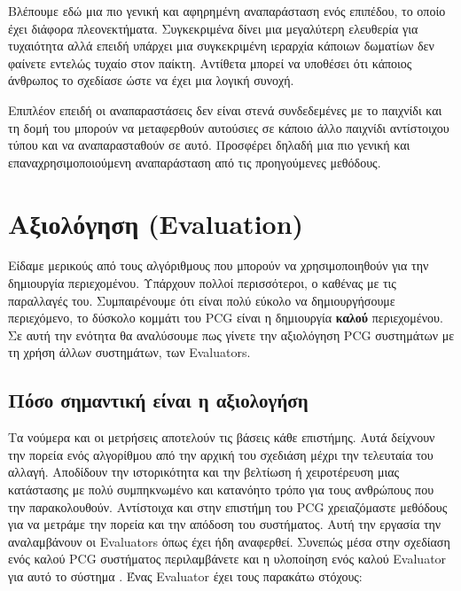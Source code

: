 \par
Βλέπουμε εδώ μια πιο γενική και αφηρημένη αναπαράσταση ενός επιπέδου, το οποίο έχει διάφορα πλεονεκτήματα. Συγκεκριμένα δίνει μια μεγαλύτερη ελευθερία για τυχαιότητα αλλά επειδή υπάρχει μια συγκεκριμένη ιεραρχία κάποιων δωματίων δεν φαίνετε εντελώς τυχαίο στον παίκτη. Αντίθετα μπορεί να υποθέσει ότι κάποιος άνθρωπος το σχεδίασε ώστε να έχει μια λογική συνοχή.
\par
Επιπλέον επειδή οι αναπαραστάσεις δεν είναι στενά συνδεδεμένες με το παιχνίδι και τη δομή του μπορούν να μεταφερθούν αυτούσιες σε κάποιο άλλο παιχνίδι αντίστοιχου τύπου και να αναπαρασταθούν σε αυτό. Προσφέρει δηλαδή μια πιο γενική και επαναχρησιμοποιούμενη αναπαράσταση από τις προηγούμενες μεθόδους.


\section{Αξιολόγηση (Evaluation)}
Είδαμε μερικούς από τους αλγόριθμους που μπορούν να χρησιμοποιηθούν για την δημιουργία περιεχομένου. Υπάρχουν πολλοί περισσότεροι, ο καθένας με τις παραλλαγές του. Συμπαιρένουμε ότι είναι πολύ εύκολο να δημιουργήσουμε περιεχόμενο, το δύσκολο κομμάτι του PCG είναι η δημιουργία \textbf{καλού} περιεχομένου. Σε αυτή την ενότητα θα αναλύσουμε πως γίνετε την αξιολόγηση PCG συστημάτων με τη χρήση άλλων συστημάτων, των Evaluators. \cite{pcgevaluation}

\subsection{Πόσο σημαντική είναι η αξιολογήση}
Τα νούμερα και οι μετρήσεις αποτελούν τις βάσεις κάθε επιστήμης. Αυτά δείχνουν την πορεία ενός αλγορίθμου από την αρχική του σχεδιάση μέχρι την τελευταία του αλλαγή. Αποδίδουν την ιστορικότητα και την βελτίωση ή χειροτέρευση μιας κατάστασης με πολύ συμπηκνωμένο και κατανόητο τρόπο για τους ανθρώπους που την παρακολουθούν. Αντίστοιχα και στην επιστήμη του PCG χρειαζόμαστε μεθόδους για να μετράμε την πορεία και την απόδοση του συστήματος. Αυτή την εργασία την αναλαμβάνουν οι Evaluators όπως έχει ήδη αναφερθεί. Συνεπώς μέσα στην σχεδίαση ενός καλού PCG συστήματος περιλαμβάνετε και η υλοποίηση ενός καλού Evaluator για αυτό το σύστημα \cite{genericevaluation}. Ένας Evaluator έχει τους παρακάτω στόχους:

